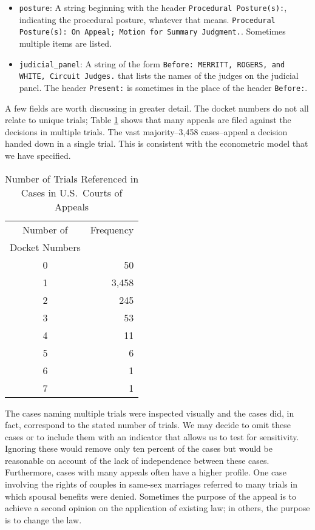 \documentclass[11pt]{paper}
\begin{document}
\begin{itemize}
	\item \texttt{posture}: A string beginning with the header 
		\texttt{Procedural Posture(s):}, indicating the procedural posture, 
		whatever that means. 
		\texttt{Procedural Posture(s): On Appeal; Motion for Summary Judgment.}. 
		Sometimes multiple items are listed. 

	\item \texttt{judicial\_panel}: A string of the form 
		\texttt{Before: MERRITT, ROGERS, and WHITE, Circuit Judges.} 
		that lists the names of the judges on the judicial panel. 
		The header \texttt{Present:} is sometimes in the place of 
		the header \texttt{Before:}.  
		

\end{itemize}

A few fields are worth discussing in greater detail. 
The docket numbers do not all relate to unique trials;
Table \ref{tab:num_docket_numbers} shows that 
many appeals are filed against the decisions in multiple trials. 
The vast majority--3,458 cases--appeal a decision
handed down in a single trial. 
This is consistent with the econometric model that we have specified. 

% 
\begin{table}[ht]
\centering
\begin{tabular}{c r}
  \hline
	Number of 			& Frequency \\ 
	Docket Numbers 	&  \\ 
  \hline
	 0 							& 50 \\ 
	 1 							& 3,458 \\ 
	 2 							& 245 \\ 
	 3 							& 53 \\ 
	 4 							& 11 \\ 
	 5 							& 6 \\ 
	 6 							& 1 \\ 
	 7 							& 1 \\ 
   \hline
\end{tabular}
\caption{Number of Trials Referenced in Cases in U.S.~Courts of Appeals} 
\label{tab:num_docket_numbers}
\end{table}

The cases naming multiple trials were inspected visually
and the cases did, in fact, correspond to the stated number of trials.
We may decide to omit these cases 
or to include them with an indicator 
that allows us to test for sensitivity. 
Ignoring these would remove only ten percent of the cases
but would be reasonable on account of the lack of independence between these cases. 
Furthermore, cases with many appeals often have a higher profile. 
One case involving the rights of couples in same-sex marriages
referred to many trials in which spousal benefits were denied. 
Sometimes the purpose of the appeal is to achieve a second opinion on
the application of existing law;
in others, the purpose is to change the law. 
\end{document}
